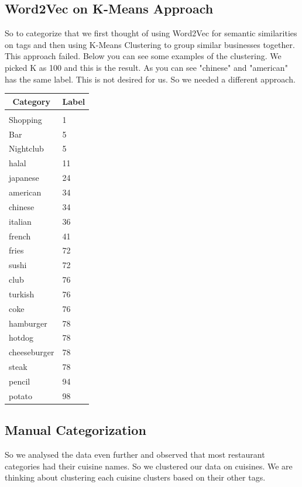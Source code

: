 \documentclass{article} %
\begin{document}
\subsection{Word2Vec on K-Means Approach}

So to categorize that we first thought of using Word2Vec for semantic similarities on tags and then using K-Means Clustering to group similar businesses together. This approach failed. Below you can see some examples of the clustering. We picked K as 100 and this is the result. As you can see "chinese" and "american" has the same label. This is not desired for us. So we needed a different approach.

\begin{center}
\begin{tabular}{ll}
\multicolumn{1}{c}{\bf Category}  &\multicolumn{1}{c}{\bf Label}
\\ \hline \\
Shopping	&	1 \\
Bar         &	5 \\
Nightclub	&  	5 \\
halal		& 11\\
japanese	& 24\\
american	& 34\\
chinese	& 34\\
italian	& 36\\
french	& 41\\
fries		& 72\\
sushi		& 72\\
club		& 76\\
turkish	& 76\\
coke		& 76\\
hamburger	&	78  \\
hotdog		&	78\\
cheeseburger &	 78\\
steak		& 78\\
pencil	& 94\\
potato	& 98\\

\end{tabular}
\end{center}
\newpage

\subsection{Manual Categorization}

So we analysed the data even further and observed that most restaurant categories had  their cuisine names. So we clustered our data on cuisines. We are thinking about clustering each cuisine clusters based on their other tags.
\end{document}
